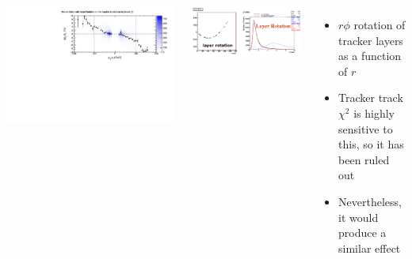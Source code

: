 \documentclass[compress]{beamer}
\begin{document}
\begin{frame}
\begin{columns}
\includegraphics[width=\linewidth]{momenta_layerRotation.pdf}

\includegraphics[width=\linewidth]{layerRotation.png}

\begin{itemize}
\item $r\phi$ rotation of tracker layers as a function of $r$

\item Tracker track $\chi^2$ is highly sensitive to this, so it has been ruled out

\item Nevertheless, it would produce a similar effect
\end{itemize}
\end{columns}
\end{frame}
\end{document}
